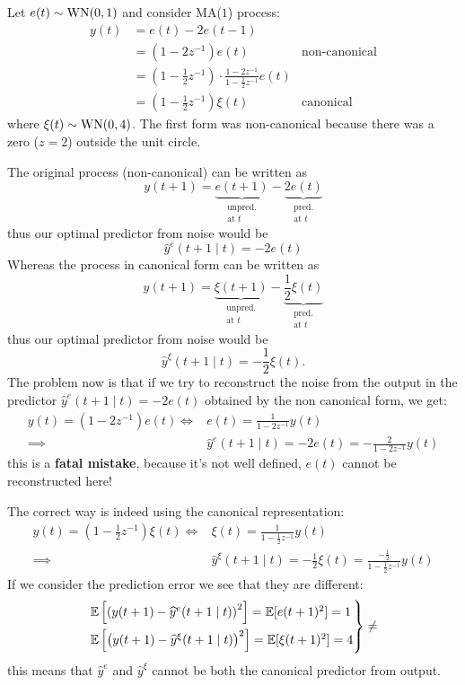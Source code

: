 \begin{exa}
Let $e(t)\sim \operatorname{WN}(0,1)$ and consider MA($1$) process:
\begin{align*}
	y(t) &= e(t) - 2 e(t-1)\\
	&= (1-2z^{-1} )e(t) &\text{non-canonical}\\
	&=\left( 1-\frac{1}{2} z^{-1}  \right) \cdot\frac{1-2z^{-1}}{1-\frac{1}{2} z^{-1}} e(t)\\
	&=\left( 1-\frac{1}{2} z^{-1}  \right) \xi(t) &\text{canonical}
\end{align*}
where $\xi(t)\sim \operatorname{WN}(0,4)$. The first form was non-canonical because there was a zero ($z=2$) outside the unit circle.

The original process (non-canonical) can be written as
\[
	y(t+1)=\underbrace{e(t+1)}_{\substack{\text{unpred.}\\\text{at $t$}}}-\underbrace{2e(t)}_{\substack{\text{pred.}\\\text{at $t$}}}
\]
thus our optimal predictor from noise would be
\[
	\hat y^{e} (t+1\mid t) = -2e(t)
\]
Whereas the process in canonical form can be written as 
\[
	y(t+1) =\underbrace{\xi(t+1)}_{\substack{\text{unpred.}\\\text{at $t$}}}-\underbrace{\frac{1}{2} \xi(t)}_{\substack{\text{pred.}\\\text{at $t$}}}
\]
thus our optimal predictor from noise would be
\[
	\hat y^{\xi} (t+1\mid t)=-\frac{1}{2} \xi(t).
\]
The problem now is that if we try to reconstruct the noise from the output in the predictor $\hat y^{e} (t+1\mid t) = -2e(t)$ obtained by the non canonical form, we get:
\begin{align*}
	y(t)=(1-2z^{-1})e(t) \iff & e(t) =\frac{1}{1-2z^{-1}} y(t)\\
	\implies & \hat y^{e} (t+1\mid t) = -2e(t) = -\frac{2}{1-2z^{-1}}y(t)
\end{align*}
this is a \textbf{fatal mistake}, because it's not well defined, $e(t)$ cannot be reconstructed here!

The correct way is indeed using the canonical representation:
\begin{align*}
	y(t) = \left( 1-\frac{1}{2} z^{-1}  \right) \xi(t) \iff & \xi(t) = \frac{1}{1-\frac{1}{2} z^{-1} } y(t)\\
	\implies & \boxed{\hat y^{\xi} (t+1\mid t)= -\frac{1}{2} \xi(t) = \frac{-\frac{1}{2} }{1-\frac{1}{2} z^{-1} } y(t)}
\end{align*}
If we consider the prediction error we see that they are different:
\[
	\begin{rcases}
		\mathbb{E}\left[\left( y(t+1)-\widehat    y^{e}(t+1\mid t) \right)^2 \right] = \mathbb{E}[e(t+1)^2]   = 1\\
		\mathbb{E}\left[\left( y(t+1)-\widehat y ^{\xi}(t+1\mid t) \right)^2 \right] = \mathbb{E}[\xi(t+1)^2] = 4
	\end{rcases}
	\neq
\]
this means that $\hat y^{e} $ and $\hat y^{\xi} $ cannot be both the canonical predictor from output.
\end{exa}

